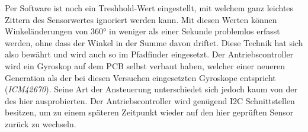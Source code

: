 \documentclass[main.tex]{subfiles} %
\begin{document}
Per Software ist noch ein Treshhold-Wert eingestellt, mit welchem ganz leichtes
Zittern des Sensorwertes ignoriert werden kann. Mit diesen Werten können
Winkeländerungen von 360° in weniger als einer Sekunde problemlos erfasst
werden, ohne dass der Winkel in der Summe davon driftet. Diese Technik hat sich
also bewährt und wird auch so im Pfadfinder eingesetzt. Der Antriebscontroller
wird ein Gyroskop auf dem PCB selbst verbaut haben, welcher einer neueren
Generation als der bei diesen Versuchen eingesetzten Gyroskope entspricht
(\textit{ICM42670}). Seine Art der Ansteuerung unterschiedet sich jedoch kaum
von der des hier ausprobierten. Der Antriebscontroller wird genügend I2C
Schnittstellen besitzen, um zu einem späteren Zeitpunkt wieder auf den hier
geprüften Sensor zurück zu wechseln.
\end{document}
